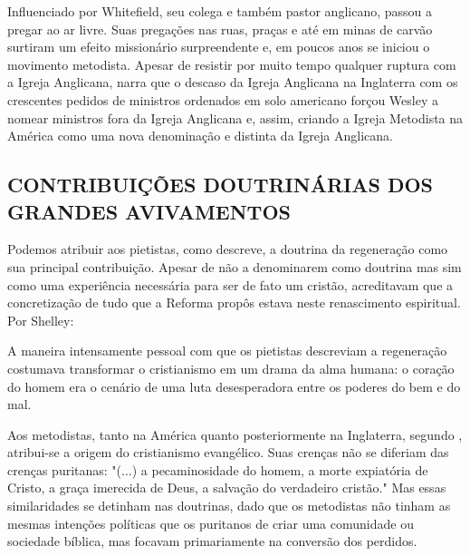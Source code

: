 \documentclass[
    article,            %
	12pt,				%
	oneside,			%
	a4paper,			%
	chapter=TITLE,		%
	section=TITLE,		%
	english,			%
	french,				%
	spanish,			%
	brazil				%
	]{abntex2}
\begin{document}
Influenciado por Whitefield, seu colega e também pastor anglicano, passou a pregar ao ar livre. Suas pregações nas ruas, praças e até em minas de carvão surtiram um efeito missionário surpreendente e, em poucos anos se iniciou o movimento metodista. Apesar de resistir por muito tempo qualquer ruptura com a Igreja Anglicana,  narra que o descaso da Igreja Anglicana na Inglaterra com os crescentes pedidos de ministros ordenados em solo americano forçou Wesley a nomear ministros fora da Igreja Anglicana e, assim, criando a Igreja Metodista na América como uma nova denominação e distinta da Igreja Anglicana.

\subsection{CONTRIBUIÇÕES DOUTRINÁRIAS DOS GRANDES AVIVAMENTOS}
Podemos atribuir aos pietistas, como  descreve, a doutrina da regeneração como sua principal contribuição. Apesar de não a denominarem como doutrina mas sim como uma experiência necessária para ser de fato um cristão, acreditavam que a concretização de tudo que a Reforma propôs estava neste renascimento espiritual. Por Shelley:
\begin{citacao}
A maneira intensamente pessoal com que os pietistas descreviam a regeneração costumava transformar o cristianismo em um drama da alma humana: o coração do homem era o cenário de uma luta desesperadora entre os poderes do bem e do mal. \cite[p.218]{SHELLEY}
\end{citacao}

Aos metodistas, tanto na América quanto posteriormente na Inglaterra, segundo , atribui-se a origem do cristianismo evangélico. Suas crenças não se diferiam das crenças puritanas: "(...) a pecaminosidade do homem, a morte expiatória de Cristo, a graça imerecida de Deus, a salvação do verdadeiro cristão." \cite[p.219]{SHELLEY} Mas essas similaridades se detinham nas doutrinas, dado que os metodistas não tinham as mesmas intenções políticas que os puritanos de criar uma comunidade ou sociedade bíblica, mas focavam primariamente na conversão dos perdidos.
\end{document}
